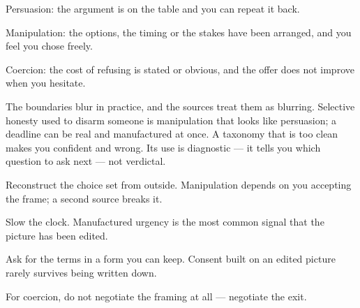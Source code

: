 \begin{feedback}
  \item Persuasion: the argument is on the table and you can repeat it back.
  \item Manipulation: the options, the timing or the stakes have been arranged, and you feel you chose freely.
  \item Coercion: the cost of refusing is stated or obvious, and the offer does not improve when you hesitate.
\end{feedback}

\begin{failure}
The boundaries blur in practice, and the sources treat them as blurring. Selective honesty used to disarm someone is manipulation that looks like persuasion; a deadline can be real and manufactured at once. A taxonomy that is too clean makes you confident and wrong. Its use is diagnostic --- it tells you which question to ask next --- not verdictal.
\end{failure}

\begin{countermeasures}
  \item Reconstruct the choice set from outside. Manipulation depends on you accepting the frame; a second source breaks it.
  \item Slow the clock. Manufactured urgency is the most common signal that the picture has been edited.
  \item Ask for the terms in a form you can keep. Consent built on an edited picture rarely survives being written down.
  \item For coercion, do not negotiate the framing at all --- negotiate the exit.
\end{countermeasures}

\seesources
{}
